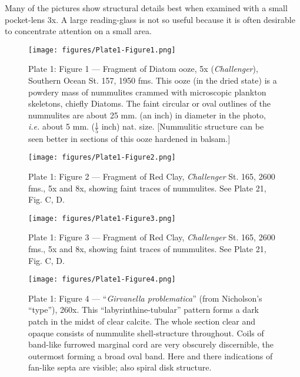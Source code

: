 \documentclass[a4paper, 12pt, oneside]{article}
\begin{document}
Many of the pictures show structural details best when examined with a small pocket-lens 3x. A large reading-glass is not so useful because it is often desirable to concentrate attention on a small area.
\clearpage
\pagestyle{fancy}
\fancyhf{}
\cfoot{\thepage}
\begin{figure}[b]
\centering
\texttt{[image: figures/Plate1-Figure1.png]}
\caption{\small Plate 1: Figure 1 --- Fragment of Diatom ooze, 5x (\emph{Challenger}), Southern Ocean St. 157, 1950 fms. This ooze (in the dried state) is a powdery mass of nummulites crammed with microscopic plankton skeletons, chiefly Diatoms. The faint circular or oval outlines of the nummulites are about 25 mm. (an inch) in diameter in the photo, \emph{i.e.} about 5 mm. ($\frac{1}{5}$ inch) nat. size. [Nummulitic structure can be seen better in sections of this ooze hardened in balsam.]}
\end{figure}
\clearpage
\begin{figure}[b]
\centering
\texttt{[image: figures/Plate1-Figure2.png]}
\caption{\small Plate 1: Figure 2 --- Fragment of Red Clay, \emph{Challenger} St. 165, 2600 fms., 5x and 8x, showing faint traces of nummulites. See Plate 21, Fig. C, D.}
\end{figure}
\clearpage
\begin{figure}[b]
\centering
\texttt{[image: figures/Plate1-Figure3.png]}
\caption{\small Plate 1: Figure 3 --- Fragment of Red Clay, \emph{Challenger} St. 165, 2600 fms., 5x and 8x, showing faint traces of nummulites. See Plate 21, Fig. C, D.}
\end{figure}
\clearpage
\begin{figure}[b]
\centering
\texttt{[image: figures/Plate1-Figure4.png]}
\caption{\small Plate 1: Figure 4 --- ``\emph{Girvanella problematica}'' (from Nicholson's ``type''), 260x. This ``labyrinthine-tubular'' pattern forms a dark patch in the midst of clear calcite. The whole section clear and opaque consists of nummulite shell-structure throughout. Coils of band-like furrowed marginal cord are very obscurely discernible, the outermost forming a broad oval band. Here and there indications of fan-like septa are visible; also spiral disk structure.}
\end{figure}
\end{document}
